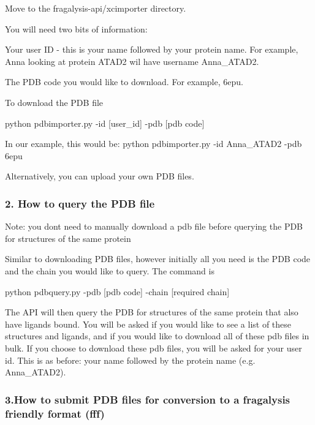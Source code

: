 Move to the fragalysis-\/api/xcimporter directory.

You will need two bits of information\+:
\begin{DoxyEnumerate}
\item Your \textquotesingle{}user ID\textquotesingle{} -\/ this is your name followed by your protein name. For example, Anna looking at protein A\+T\+A\+D2 wil have username \textquotesingle{}Anna\+\_\+\+A\+T\+A\+D2\textquotesingle{}.
\item The P\+DB code you would like to download. For example, \textquotesingle{}6epu\textquotesingle{}.
\end{DoxyEnumerate}

To download the P\+DB file


\begin{DoxyCode}
python pdbimporter.py -id [user\_id] -pdb [pdb code]
\end{DoxyCode}


In our example, this would be\+: {\ttfamily python pdbimporter.\+py -\/id Anna\+\_\+\+A\+T\+A\+D2 -\/pdb 6epu}

Alternatively, you can upload your own P\+DB files.

\subsubsection*{2. How to query the P\+DB file}

Note\+: you don\textquotesingle{}t need to manually download a pdb file before querying the P\+DB for structures of the same protein

Similar to downloading P\+DB files, however initially all you need is the P\+DB code and the chain you would like to query. The command is


\begin{DoxyCode}
python pdbquery.py -pdb [pdb code] -chain [required chain]
\end{DoxyCode}


The A\+PI will then query the P\+DB for structures of the same protein that also have ligands bound. You will be asked if you would like to see a list of these structures and ligands, and if you would like to download all of these pdb files in bulk. If you choose to download these pdb files, you will be asked for your user id. This is as before\+: your name followed by the protein name (e.\+g. Anna\+\_\+\+A\+T\+A\+D2).

\subsubsection*{3.\+How to submit P\+DB files for conversion to a fragalysis friendly format (fff)}

